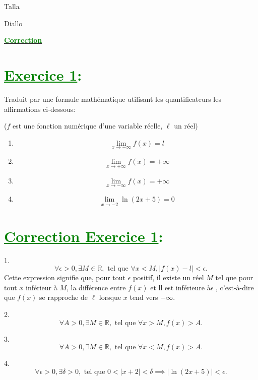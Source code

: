 \documentclass[12pt]{article}
\begin{document}
\begin{minipage}{0.8\textwidth}
	Talla                        
\end{minipage}
\begin{minipage}{0.8\textwidth}
	Diallo 
\end{minipage}

\begin{center}
\textbf{{\underline{\textcolor{green}{Correction}}}}
\end{center}
\section*{\textcolor{green}{\underline{Exercice 1}:}}
Traduit par une formule mathématique utilisant les quantificateurs les affirmations ci-dessous:

($f$ est une fonction numérique d'une variable réelle, $\ell$ un réel)
\begin{enumerate}
\item \[\lim_{x \to -\infty} f(x) = l\]

\item \[\lim_{x \to +\infty} f(x) = +\infty\]

\item \[\lim_{x \to -\infty} f(x) = +\infty\]

\item \[\lim_{x \to -2} \ln(2x+5) = 0\]

\end{enumerate}
\section*{\textcolor{green}{\underline{Correction Exercice 1}:}}
1. 
\[
\forall \epsilon > 0, \exists M \in \mathbb{R}, \text{ tel que } \forall x < M, |f(x) - l| < \epsilon.
\]
Cette expression signifie que, pour tout $\epsilon$ positif, il existe un réel $M$ tel que pour tout $x$ inférieur à $M$, la différence entre $f(x)$ et ll est inférieure à$\epsilon$ , c'est-à-dire que $f(x)$ se rapproche de $\ell$ lorsque $x$ tend vers $-\infty$.

2.
\[
\forall A > 0, \exists M \in \mathbb{R}, \text{ tel que } \forall x > M, f(x) > A.
\]


3. 
\[
\forall A > 0, \exists M \in \mathbb{R}, \text{ tel que } \forall x < M, f(x) > A.
\]


4. 
\[
\forall \epsilon > 0, \exists \delta > 0, \text{ tel que } 0 < |x + 2| < \delta \implies |\ln(2x+5)| < \epsilon.
\]
\end{document}
